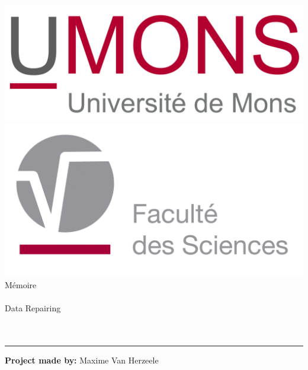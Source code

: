 \documentclass[letterpaper, 12pt]{report}
\theoremstyle{definition}
\begin{document}
\begin{titlepage}

\noindent


\begin{center}
\includegraphics[scale=0.2]{umonslogo}\\
\vspace*{0.7cm}
\includegraphics[scale=0.32]{fs-logo}\\
\vspace*{2.5cm}
\titlefont Mémoire\\~\\{\LARGE  Data Repairing\\}~\\~\\{\large} \par
\end{center}
\vspace*{3.5cm}
\hfill
\begin{minipage}{0.18\linewidth}
  \begin{flushright}
   \rule{0.5pt}{75pt}
  \end{flushright}
\end{minipage}
\begin{minipage}{0.8\linewidth}
\begin{flushleft}
\textsf{\textbf{Project made by:}} Maxime Van Herzeele\\

\end{flushleft}
\end{minipage}
\end{titlepage}
\end{document}
